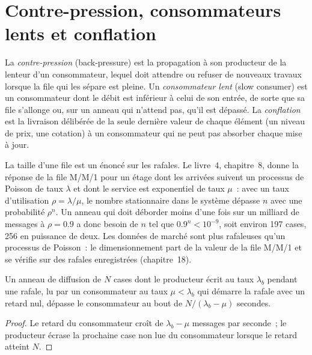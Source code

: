 \section{Contre-pression, consommateurs lents et conflation}

\begin{definition}\label{def:ll:queues-ring-buffers-and-shared-memory:bp}
La \emph{contre-pression} (back-pressure) est la propagation à son producteur de la lenteur d'un consommateur, lequel doit attendre ou
refuser de nouveaux travaux lorsque la file qui les sépare est pleine. Un \emph{consommateur lent} (slow consumer) est un consommateur dont le débit
est inférieur à celui de son entrée, de sorte que sa file s'allonge ou, sur un anneau qui n'attend pas, qu'il est dépassé. La \emph{conflation}
est la livraison délibérée de la seule dernière valeur de chaque élément (un niveau de prix, une cotation) à un consommateur qui ne peut pas absorber
chaque mise à jour.
\end{definition}

La taille d'une file est un énoncé sur les rafales. Le livre~4, chapitre~8, donne la réponse de la file M/M/1 pour un étage dont les arrivées suivent un processus
de Poisson de taux $\lambda$ et dont le service est exponentiel de taux $\mu$~: avec un taux d'utilisation $\rho = \lambda/\mu$, le nombre stationnaire
dans le système dépasse $n$ avec une probabilité $\rho^n$. Un anneau qui doit déborder moins d'une fois sur un milliard de messages à $\rho = 0.9$
a donc besoin de $n$ tel que $0.9^n < 10^{-9}$, soit environ 197 cases, 256 en puissance de deux. Les données de marché sont plus rafaleuses qu'un processus
de Poisson~: le dimensionnement part de la valeur de la file M/M/1 et se vérifie sur des rafales enregistrées (chapitre~18).

\begin{proposition}\label{prop:ll:queues-ring-buffers-and-shared-memory:lap}
Un anneau de diffusion de $N$ cases dont le producteur écrit au taux $\lambda_b$ pendant une rafale, lu par un consommateur au taux $\mu < \lambda_b$
qui démarre la rafale avec un retard nul, dépasse le consommateur au bout de $N/(\lambda_b - \mu)$ secondes.
\end{proposition}

\begin{proof}
Le retard du consommateur croît de $\lambda_b - \mu$ messages par seconde~; le producteur écrase la prochaine case non lue du consommateur lorsque
le retard atteint $N$.
\end{proof}

